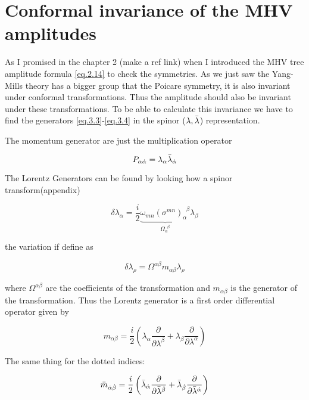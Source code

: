 \section{Conformal invariance of the MHV amplitudes}

As I promised in the chapter 2 (make a ref link) when I introduced the MHV tree amplitude formula \eqref{eq.2.14} to check the symmetries. As we just saw the Yang-Mills theory has a bigger group that the Poicare symmetry, it is also invariant under conformal transformations. Thus the amplitude should also be invariant under these transformations. To be able to calculate this invariance we have to find the generators \eqref{eq.3.3}-\eqref{eq.3.4} in the spinor ($\lambda,\bar{\lambda}$) representation.


The momentum generator are just the multiplication operator

\begin{equation}
P_{\alpha \dot{\alpha}} = \lambda_{\alpha}\bar{\lambda}_{\dot{\alpha}}
\end{equation}

The Lorentz Generators can be found by looking how a spinor transform(appendix)

\begin{equation}
\delta \lambda_{\alpha} = \frac{i}{2} \underbrace{\omega_{mn}(\sigma^{mn})_{\alpha}^{\;\;\beta}}_{\Omega_{\alpha}^{\;\;\beta}} \lambda_{\beta}
\end{equation}

the variation if define as

\begin{equation}
\delta \lambda_{\rho} = \Omega^{\alpha \beta} m_{\alpha \beta} \lambda_{\rho}
\end{equation}

where $\Omega^{\alpha \beta} $ are the coefficients of the transformation and $m_{\alpha \beta}$ is the generator of the transformation.
Thus the Lorentz generator is a first order differential operator given by


\begin{equation}
 m_{\alpha \beta} = \frac{i}{2} \left(  \lambda_{\alpha} \frac{\partial}{\partial \lambda^{\beta}}  + \lambda_{\beta} \frac{\partial}{\partial \lambda^{\alpha}}  \right)
\end{equation}

The same thing for the dotted indices:

\begin{equation}
 \bar{m}_{\dot{\alpha} \dot{\beta}} = \frac{i}{2} \left(  \bar{\lambda}_{\dot{\alpha}} \frac{\partial}{\partial \bar{\lambda}^{\dot{\beta}}}  + \bar{\lambda}_{\dot{\beta}} \frac{\partial}{\partial \bar{\lambda}^{\dot{\alpha}}}  \right)
\end{equation}



